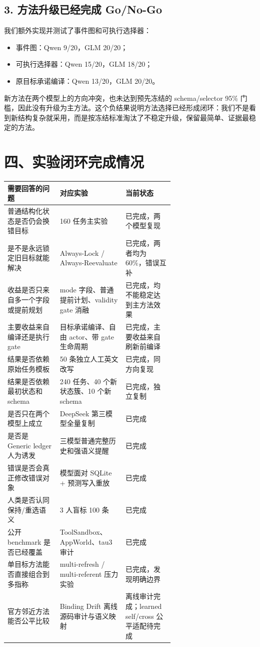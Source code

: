 \documentclass[10pt,fontset=none]{ctexart}
\begin{document}
\subsection{3. 方法升级已经完成 Go/No-Go}
\par 我们额外实现并测试了事件图和可执行选择器：
\begin{itemize}
\item 事件图：Qwen 9/20，GLM 20/20；
\item 可执行选择器：Qwen 15/20，GLM 18/20；
\item 原目标承诺编译：Qwen 13/20，GLM 20/20。
\end{itemize}
\par 新方法在两个模型上的方向冲突，也未达到预先冻结的 schema/selector 95\% 门槛，因此没有升级为主方法。这个负结果说明方法选择已经形成闭环：我们不是看到新结构复杂就采用，而是按冻结标准淘汰了不稳定升级，保留最简单、证据最稳定的方法。
\section{四、实验闭环完成情况}
\begin{longtable}{@{}p{0.220\linewidth} p{0.220\linewidth} p{0.220\linewidth}@{}}
\toprule
需要回答的问题 & 对应实验 & 当前状态 \\
\midrule\endhead
普通结构化状态是否仍会换错目标 & 160 任务主实验 & 已完成，两个模型复现 \\
是不是永远锁定旧目标就能解决 & Always-Lock / Always-Reevaluate & 已完成，两者均为 60\%，错误互补 \\
收益是否只来自多一个字段或提前规划 & mode 字段、普通提前计划、validity gate 消融 & 已完成，均不能稳定达到主方法效果 \\
主要收益来自编译还是执行 gate & 目标承诺编译、自由 actor、带 gate 生命周期 & 已完成，主要收益来自刷新前编译 \\
结果是否依赖原始任务模板 & 50 条独立人工英文改写 & 已完成，同方向复现 \\
结果是否依赖最初状态和 schema & 240 任务、40 个新状态簇、10 个新 schema & 已完成，独立复制 \\
是否只在两个模型上成立 & DeepSeek 第三模型全量复制 & 已完成 \\
是否是 Generic ledger 人为诱发 & 三模型普通完整历史和强语义提醒 & 已完成 \\
错误是否会真正修改错误对象 & 模型面对 SQLite + 预测写入重放 & 已完成 \\
人类是否认同保持/重选语义 & 3 人盲标 100 条 & 已完成 \\
公开 benchmark 是否已经覆盖 & ToolSandbox、AppWorld、tau3 审计 & 已完成 \\
单目标方法能否直接组合到多指称 & multi-refresh / multi-referent 压力实验 & 已完成，发现明确边界 \\
官方邻近方法能否公平比较 & Binding Drift 离线源码审计与语义映射 & 离线审计完成；learned self/cross 公平适配待完成 \\
\bottomrule
\end{longtable}
\end{document}
